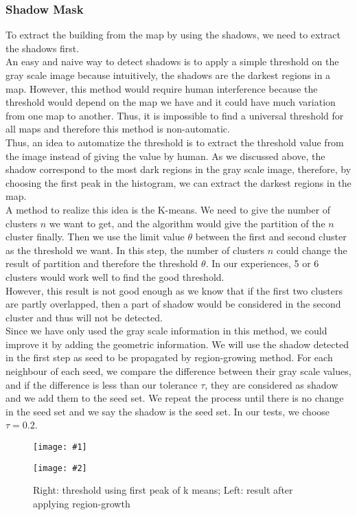 \documentclass[runningheads]{llncs}
\newcommand{\insertTwoF}[5]{
  \begin{figure}[h!]
    \centering
    \begin{minipage}{#4\linewidth}
    \texttt{[image: \#1]}
    \end{minipage}
    \begin{minipage}{#4\linewidth}
    \texttt{[image: \#2]}
    \end{minipage}
      \caption{#3}
      \label{#5}
  \end{figure}  
}
\begin{document}
\subsubsection{Shadow Mask}
To extract the building from the map by using the shadows, we need to extract the shadows first. \\
An easy and naive way to detect shadows is to apply a simple threshold on the gray scale image because intuitively, the shadows are the darkest regions in a map. However, this method would require human interference because the threshold would depend on the map we have and it could have much variation from one map to another. Thus, it is impossible to find a universal threshold for all maps and therefore this method is non-automatic.\\
Thus, an idea to automatize the threshold is to extract the threshold value from the image instead of giving the value by human. As we discussed above, the shadow correspond to the most dark regions in the gray scale image, therefore, by choosing the first peak in the histogram, we can extract the darkest regions in the map. \\
A method to realize this idea is the K-means. We need to give the number of clusters $n$ we want to get, and the algorithm would give the partition of the $n$ cluster finally. Then we use the limit value $\theta$ between the first and second cluster as the threshold we want. In this step, the number of clusters $n$ could change the result of partition and therefore the threshold $\theta$. In our experiences, 5 or 6 clusters would work well to find the good threshold.\\
However, this result is not good enough as we know that if the first two clusters are partly overlapped, then a part of shadow would be considered in the second cluster and thus will not be detected.\\ 
Since we have only used the gray scale information in this method, we could improve it by adding the geometric information. We will use the shadow detected in the first step as seed to be propagated by region-growing method. For each neighbour of each seed, we compare the difference between their gray scale values, and if the difference is less than our tolerance $\tau$, they are considered as shadow and we add them to the seed set. We repeat the process until there is no change in the seed set and we say the shadow is the seed set. In our tests, we choose $\tau =0.2$.\\
\insertTwoF{shadow_kmeans}{shadow_croissance}{Right: threshold using first peak of k means; Left: result after applying region-growth}{0.45}{1}
\end{document}
